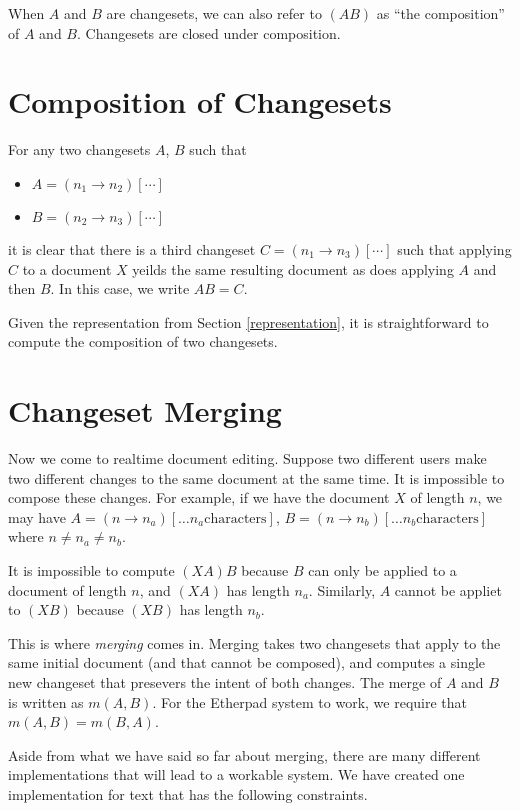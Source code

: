 \documentclass{article}
\begin{document}
When $A$ and $B$ are changesets, we can also refer to $(AB)$ as ``the composition'' of $A$ and $B$.  Changesets are closed under composition.

\section{Composition of Changesets}

For any two changesets $A$, $B$ such that

\begin{itemize}
\item[] $A=(n_1\rightarrow n_2)[\cdots]$
\item[] $B=(n_2\rightarrow n_3)[\cdots]$
\end{itemize}
it is clear that there is a third changeset $C=(n_1\rightarrow n_3)[\cdots]$ such that applying $C$ to a document $X$ yeilds the same resulting document as does applying $A$ and then $B$.  In this case, we write $AB=C$.

Given the representation from Section \ref{representation}, it is straightforward to compute the composition of two changesets.

\section{Changeset Merging}

Now we come to realtime document editing.  Suppose two different users make two different changes to the same document at the same time.  It is impossible to compose these changes.    For example, if we have the document $X$ of length $n$, we may have $A=(n\rightarrow n_a)[\ldots n_a \mathrm{characters}]$,  $B=(n\rightarrow n_b)[\ldots n_b \mathrm{characters}]$ where $n\neq n_a\neq n_b$.

It is impossible to compute $(XA)B$ because $B$ can only be applied to a document of length $n$, and $(XA)$ has length $n_a$.  Similarly, $A$ cannot be appliet to $(XB)$ because $(XB)$ has length $n_b$.

This is where \emph{merging} comes in.  Merging takes two changesets that apply to the same initial document (and that cannot be composed), and computes a single new changeset that presevers the intent of both changes.  The merge of $A$ and $B$ is written as $m(A,B)$.  For the Etherpad system to work, we require that $m(A,B)=m(B,A)$.

Aside from what we have said so far about merging, there are many different implementations that will lead to a workable system.  We have created one implementation for text that has the following constraints.
\end{document}
